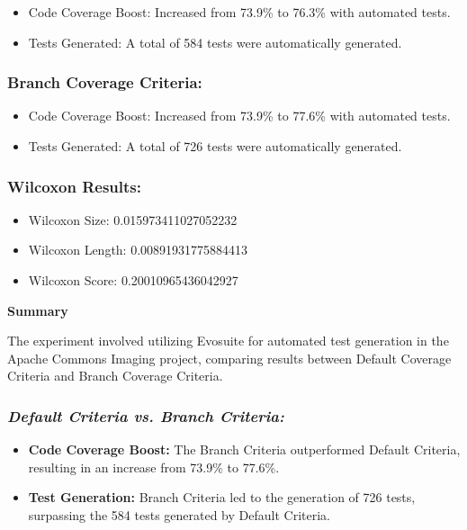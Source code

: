 \documentclass[sigconf]{acmart}
\begin{document}
 \begin{itemize}
    \item Code Coverage Boost: Increased from 73.9\% to 76.3\% with automated tests.
    \item Tests Generated: A total of 584 tests were automatically generated.
 \end{itemize}

\subsubsection{\textbf{Branch Coverage Criteria:}}

 \begin{itemize}
    \item Code Coverage Boost: Increased from 73.9\% to 77.6\% with automated tests.
    \item Tests Generated: A total of 726 tests were automatically generated.
 \end{itemize}

\subsubsection{\textbf{Wilcoxon Results:}}

 \begin{itemize}
        \item Wilcoxon Size: 0.015973411027052232
        \item Wilcoxon Length: 0.00891931775884413
        \item Wilcoxon Score: 0.20010965436042927
 \end{itemize}

\textbf{Summary}

The experiment involved utilizing Evosuite for automated test generation in the Apache Commons Imaging project, comparing results between Default Coverage Criteria and Branch Coverage Criteria.

\subsubsection{\textit{Default Criteria vs. Branch Criteria:}}

\begin{itemize}
    \item \textbf{Code Coverage Boost:} The Branch Criteria outperformed Default Criteria, resulting in an increase from 73.9\% to 77.6\%.
    \item \textbf{Test Generation:} Branch Criteria led to the generation of 726 tests, surpassing the 584 tests generated by Default Criteria.
\end{itemize}
\end{document}
